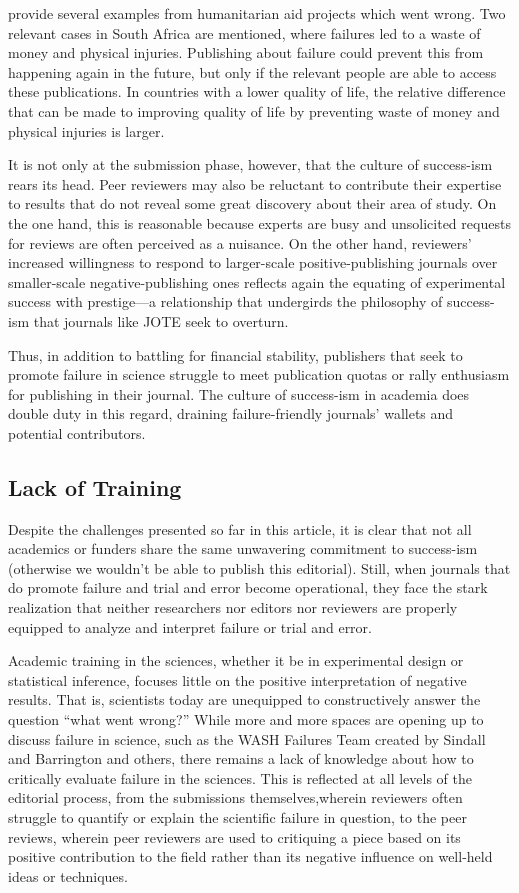 \documentclass[editorial, authordate,twocolumn,issue]{jote-new-article}
\begin{document}
\textcite{Sindall2020} provide several examples from humanitarian aid projects which went wrong. Two relevant cases in South Africa are mentioned, where failures led to a waste of money and physical injuries. Publishing about failure could prevent this from happening again in the future, but only if the relevant people are able to access these publications. In countries with a lower quality of life, the relative difference that can be made to improving quality of life by preventing waste of money and physical injuries is larger. 

It is not only at the submission phase, however, that the culture of success-ism rears its head. Peer reviewers may also be reluctant to contribute their expertise to results that do not reveal some great discovery about their area of study. On the one hand, this is reasonable because experts are busy and unsolicited requests for reviews are often perceived as a nuisance. On the other hand, reviewers' increased willingness to respond to larger-scale positive-publishing journals over smaller-scale negative-publishing ones reflects again the equating of experimental success with prestige—a relationship that undergirds the philosophy of success-ism that journals like JOTE seek to overturn. 

Thus, in addition to battling for financial stability, publishers that seek to promote failure in science struggle to meet publication quotas or rally enthusiasm for publishing in their journal. The culture of success-ism in academia does double duty in this regard, draining failure-friendly journals' wallets and potential contributors.

\subsection{Lack of Training }

Despite the challenges presented so far in this article, it is clear that not all academics or funders share the same unwavering commitment to success-ism (otherwise we wouldn't be able to publish this editorial). Still, when journals that do promote failure and trial and error become operational, they face the stark realization that neither researchers nor editors nor reviewers are properly equipped to analyze and interpret failure or trial and error. 

Academic training in the sciences, whether it be in experimental design or statistical inference, focuses little on the positive interpretation of negative results. That is, scientists today are unequipped to constructively answer the question “what went wrong?” While more and more spaces are opening up to discuss failure in science, such as the WASH Failures Team created by Sindall and Barrington and others, there remains a lack of knowledge about how to critically evaluate failure in the sciences. This is reflected at all levels of the editorial process, from the submissions themselves,wherein reviewers often struggle to quantify or explain the scientific failure in question, to the peer reviews, wherein peer reviewers are used to critiquing a piece based on its positive contribution to the field rather than its negative influence on well-held ideas or techniques. 
\end{document}

